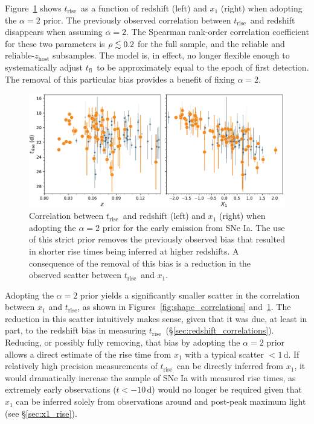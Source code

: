 \documentclass[twocolumn]{./aastex63}
\newcommand{\tfl}{$t_\mathrm{fl}$}
\newcommand{\trise}{$t_\mathrm{rise}$}
\begin{document}
Figure~\ref{fig:tsquared_z_evolution} shows \trise\ as a function of redshift
(left) and $x_1$ (right) when adopting the $\alpha = 2$ prior. The previously
observed correlation between \trise\ and redshift disappears when assuming
$\alpha = 2$. The Spearman rank-order correlation coefficient for these two
parameters is $\rho \lesssim 0.2$ for the full sample, and the reliable and
reliable-$z_\mathrm{host}$ subsamples. The model is, in effect, no longer
flexible enough to systematically adjust \tfl\ to be approximately equal to
the epoch of first detection. The removal of this particular bias provides a
benefit of fixing $\alpha = 2$.

\begin{figure}
    \centering
    \includegraphics[width=6in]{./figures/trise_z_tsquared.pdf}
    \caption{Correlation between \trise\ and redshift (left) and $x_1$ (right)
    when adopting the $\alpha = 2$ prior for the early emission from SNe Ia.
    The use of this strict prior removes the previously observed bias that
    resulted in shorter rise times being inferred at higher redshifts. A
    consequence of the removal of this bias is a reduction in the observed
    scatter between \trise\ and $x_1$.}
    \label{fig:tsquared_z_evolution}
\end{figure}


Adopting the $\alpha = 2$ prior yields a significantly smaller scatter in the
correlation between $x_1$ and \trise, as shown in
Figures~\ref{fig:shape_correlations} and~\ref{fig:tsquared_z_evolution}. The
reduction in this scatter intuitively makes sense, given that it was due, at
least in part, to the redshift bias in measuring \trise\
(\S\ref{sec:redshift_correlations}). Reducing, or possibly fully removing,
that bias by adopting the $\alpha = 2$ prior allows a direct estimate of the
rise time from $x_1$ with a typical scatter $< 1$\,d. If relatively high
precision measurements of \trise\ can be directly inferred from $x_1$, it
would dramatically increase the sample of SNe Ia with measured rise times, as
extremely early observations ($t < -10$\,d) would no longer be required given
that $x_1$ can be inferred solely from observations around and post-peak
maximum light (see \S\ref{sec:x1_rise}).
\end{document}
